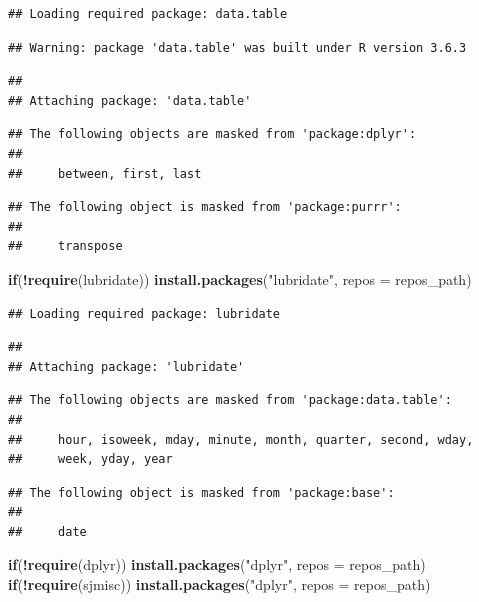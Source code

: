 \documentclass[]{article}
\newenvironment{Shaded}{\begin{snugshade}}{\end{snugshade}}
\newcommand{\ControlFlowTok}[1]{\textcolor[rgb]{0.13,0.29,0.53}{\textbf{#1}}}
\newcommand{\DataTypeTok}[1]{\textcolor[rgb]{0.13,0.29,0.53}{#1}}
\newcommand{\KeywordTok}[1]{\textcolor[rgb]{0.13,0.29,0.53}{\textbf{#1}}}
\newcommand{\NormalTok}[1]{#1}
\newcommand{\OperatorTok}[1]{\textcolor[rgb]{0.81,0.36,0.00}{\textbf{#1}}}
\newcommand{\StringTok}[1]{\textcolor[rgb]{0.31,0.60,0.02}{#1}}
\begin{document}
\begin{verbatim}
## Loading required package: data.table
\end{verbatim}

\begin{verbatim}
## Warning: package 'data.table' was built under R version 3.6.3
\end{verbatim}

\begin{verbatim}
## 
## Attaching package: 'data.table'
\end{verbatim}

\begin{verbatim}
## The following objects are masked from 'package:dplyr':
## 
##     between, first, last
\end{verbatim}

\begin{verbatim}
## The following object is masked from 'package:purrr':
## 
##     transpose
\end{verbatim}

\begin{Shaded}
\begin{Highlighting}[]
\ControlFlowTok{if}\NormalTok{(}\OperatorTok{!}\KeywordTok{require}\NormalTok{(lubridate)) }\KeywordTok{install.packages}\NormalTok{(}\StringTok{"lubridate"}\NormalTok{, }\DataTypeTok{repos =}\NormalTok{ repos_path)}
\end{Highlighting}
\end{Shaded}

\begin{verbatim}
## Loading required package: lubridate
\end{verbatim}

\begin{verbatim}
## 
## Attaching package: 'lubridate'
\end{verbatim}

\begin{verbatim}
## The following objects are masked from 'package:data.table':
## 
##     hour, isoweek, mday, minute, month, quarter, second, wday,
##     week, yday, year
\end{verbatim}

\begin{verbatim}
## The following object is masked from 'package:base':
## 
##     date
\end{verbatim}

\begin{Shaded}
\begin{Highlighting}[]
\ControlFlowTok{if}\NormalTok{(}\OperatorTok{!}\KeywordTok{require}\NormalTok{(dplyr)) }\KeywordTok{install.packages}\NormalTok{(}\StringTok{"dplyr"}\NormalTok{, }\DataTypeTok{repos =}\NormalTok{ repos_path)}
\ControlFlowTok{if}\NormalTok{(}\OperatorTok{!}\KeywordTok{require}\NormalTok{(sjmisc)) }\KeywordTok{install.packages}\NormalTok{(}\StringTok{"dplyr"}\NormalTok{, }\DataTypeTok{repos =}\NormalTok{ repos_path)}
\end{Highlighting}
\end{Shaded}
\end{document}
